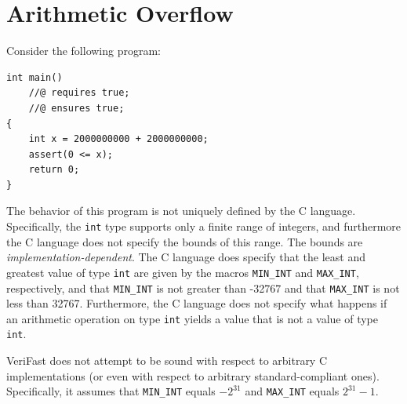 \documentclass{article}
\begin{document}
\section{Arithmetic Overflow}

Consider the following program:
\begin{lstlisting}
int main()
    //@ requires true;
    //@ ensures true;
{
    int x = 2000000000 + 2000000000;
    assert(0 <= x);
    return 0;
}
\end{lstlisting}
The behavior of this program is not uniquely defined by the C
language. Specifically, the \lstinline!int! type supports only
a finite range of integers, and furthermore the C language does
not specify the bounds of this range. The bounds are
\emph{implementation-dependent}. The C language does specify
that the least and greatest value of type \lstinline!int! are
given by the macros \lstinline!MIN_INT! and
\lstinline!MAX_INT!, respectively, and that \lstinline!MIN_INT!
is not greater than -32767 and that \lstinline!MAX_INT! is not
less than 32767. Furthermore, the C language does not specify
what happens if an arithmetic operation on type \lstinline!int!
yields a value that is not a value of type \lstinline!int!.

VeriFast does not attempt to be sound with respect to arbitrary
C implementations (or even with respect to arbitrary
standard-compliant ones). Specifically, it assumes that
\lstinline!MIN_INT! equals $-2^{31}$ and \lstinline!MAX_INT!
equals $2^{31}-1$.
\end{document}
